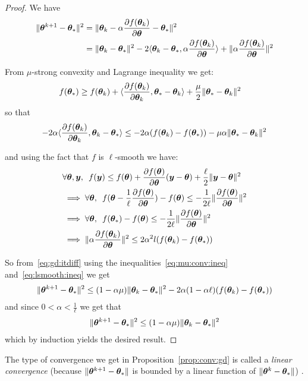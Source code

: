 \begin{proof}
  We have 
  \begin{align}
    \| \thetab^{k+1} - \thetab_* \|^2 &= \| \thetab_k -\alpha \partialfrac{\thetab}{f(\thetab_k)} - \thetab_* \|^2 \\
                            &= \| \thetab_k - \thetab_* \|^2  - 2 \dotp{ \thetab_k - \thetab_* }{ \alpha \partialfrac{\thetab}{f(\thetab_k)} } + \|\alpha \partialfrac{\thetab}{f(\thetab_k)} \|^2  \label{eq:gd:itdiff}
 \end{align}

 From $\mu$-strong convexity and Lagrange inequality we get:
 \begin{align}
   &f(\thetab_*) \geq f(\thetab_k) + \dotp{ \partialfrac{\thetab_k}{f(\thetab_k)} }{ \thetab_* - \thetab_k } + \frac{\mu}{2} \|\thetab_* - \thetab_k \|^2
 \end{align}
 so that 
 \begin{align}
   -2 \alpha \dotp{ \partialfrac{\thetab_k}{f(\thetab_k)} }{ \thetab_k -  \thetab_*} \leq  -2 \alpha(f(\thetab_k) - f(\thetab_*)) - \mu \alpha \|\thetab_* - \thetab_k \|^2 \label{eq:mu:conv:ineq}
   \end{align}

   and using the fact that $f$ is $\ell$-smooth we have: 
   \begin{align}
     &\forall \thetab, \yb, \enspace f(\yb) \leq f(\thetab) + \partialfrac{\thetab}{f(\thetab)} (\yb - \thetab) + \frac{\ell}{2} \| \yb - \thetab \|^2 \\
     &\implies \forall \thetab, \enspace f(\thetab - \frac1{\ell} \partialfrac{\thetab}{f(\thetab)}) - f(\thetab) \leq -\frac1{2\ell} \| \partialfrac{\thetab}{f(\thetab)} \|^2 \\
     &\implies \forall \thetab, \enspace f(\thetab_*) - f(\thetab) \leq -\frac1{2\ell} \| \partialfrac{\thetab}{f(\thetab)} \|^2  \\
     &\implies \|\alpha \partialfrac{\thetab}{f(\thetab_k)} \|^2 \leq 2\alpha^2 l(f(\thetab_k) - f(\thetab_*)) \label{eq:lsmooth:ineq}
   \end{align}

   So from~\eqref{eq:gd:itdiff} using the inequalities~\eqref{eq:mu:conv:ineq}
   and~\eqref{eq:lsmooth:ineq} we get
   \begin{align}
     \| \thetab^{k+1} - \thetab_* \|^2 \leq (1 - \alpha \mu)\| \thetab_k - \thetab_* \|^2 -2 \alpha (1 - \alpha \ell) (f(\thetab_k) - f(\thetab_*))
   \end{align} 
   and since $0 < \alpha < \frac1{\ell}$ we get that 
   \begin{align}
     \| \thetab^{k+1} - \thetab_* \|^2 \leq (1 - \alpha \mu)\| \thetab_k - \thetab_* \|^2
   \end{align}
   which by induction yields the desired result.
\end{proof}
The type of convergence we get in Proposition~\ref{prop:conv:gd} is called a
\emph{linear convergence} (because $\| \thetab^{k+1} - \thetab_*
\|$ is bounded by a linear function of  $\|\thetab^{k} - \thetab_* \|$) .

